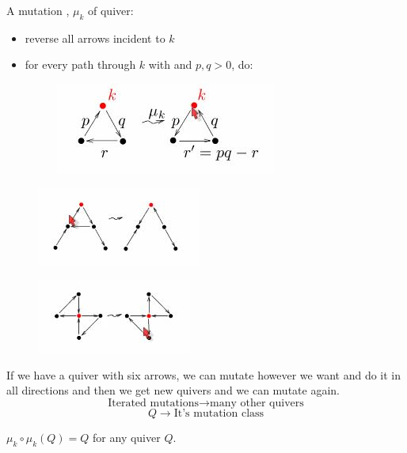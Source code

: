 \documentclass{article}
\begin{document}
\begin{ndefi}[Mutation]
  A mutation , $\mu_k$ of quiver:
  \begin{itemize}
    \item reverse all arrows incident to $k$
    \item for every path through $k$ with  and $p, q > 0$, do:
    \begin{figure}[!ht]
    \centering
    \includegraphics{./figures/L3.1}
    \end{figure}
  \end{itemize}
\end{ndefi}

\begin{eg}
  \begin{figure}[!ht]
  \centering
  \includegraphics{./figures/L3.2}
  \end{figure}
  \begin{figure}[!ht]
  \centering
  \includegraphics{./figures/L3.3}
  \end{figure}
\end{eg}

If we have a quiver with six arrows, we can mutate however we want and do it in all directions and then we get new quivers and we can mutate again.\\

$$ \text{Iterated mutations} \longrightarrow \text{many other quivers} $$
$$ Q \longrightarrow \text{It's mutation class} $$

\begin{property}
  $\mu_k \circ \mu_k (Q) = Q$ for any quiver $Q$.
\end{property}
\end{document}
